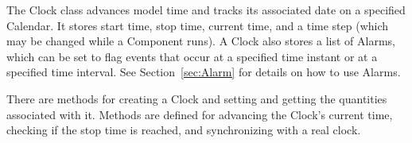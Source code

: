
\label{sec:Clock}

The Clock class advances model time and tracks its associated
date on a specified Calendar.  It stores start time, stop time,
current time, and a time step (which may be changed while a 
Component runs).  A Clock also stores a list of Alarms, which can
be set to flag events that occur at a specified time instant or at 
a specified time interval.  See Section~\ref{sec:Alarm} for 
details on how to use Alarms.

There are methods for creating a Clock and setting and getting
the quantities associated with it.  Methods are defined for 
advancing the Clock's current time, checking if the
stop time is reached, and synchronizing with a real clock. 

